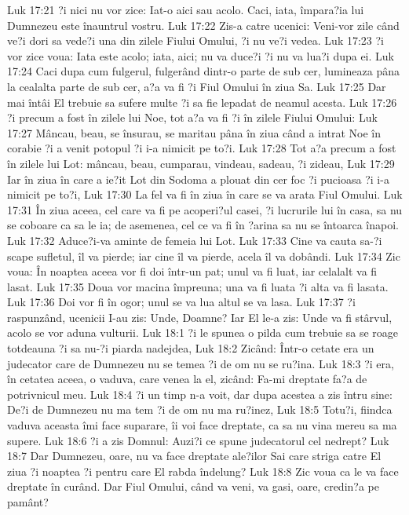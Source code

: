 Luk 17:21  ?i nici nu vor zice: Iat-o aici sau acolo. Caci, iata, împara?ia lui Dumnezeu este înauntrul vostru.
Luk 17:22  Zis-a catre ucenici: Veni-vor zile când ve?i dori sa vede?i una din zilele Fiului Omului, ?i nu ve?i vedea.
Luk 17:23  ?i vor zice voua: Iata este acolo; iata, aici; nu va duce?i ?i nu va lua?i dupa ei.
Luk 17:24  Caci dupa cum fulgerul, fulgerând dintr-o parte de sub cer, lumineaza pâna la cealalta parte de sub cer, a?a va fi ?i Fiul Omului în ziua Sa.
Luk 17:25  Dar mai întâi El trebuie sa sufere multe ?i sa fie lepadat de neamul acesta.
Luk 17:26  ?i precum a fost în zilele lui Noe, tot a?a va fi ?i în zilele Fiului Omului:
Luk 17:27  Mâncau, beau, se însurau, se maritau pâna în ziua când a intrat Noe în corabie ?i a venit potopul ?i i-a nimicit pe to?i.
Luk 17:28  Tot a?a precum a fost în zilele lui Lot: mâncau, beau, cumparau, vindeau, sadeau, ?i zideau,
Luk 17:29  Iar în ziua în care a ie?it Lot din Sodoma a plouat din cer foc ?i pucioasa ?i i-a nimicit pe to?i,
Luk 17:30  La fel va fi în ziua în care se va arata Fiul Omului.
Luk 17:31  În ziua aceea, cel care va fi pe acoperi?ul casei, ?i lucrurile lui în casa, sa nu se coboare ca sa le ia; de asemenea, cel ce va fi în ?arina sa nu se întoarca înapoi.
Luk 17:32  Aduce?i-va aminte de femeia lui Lot.
Luk 17:33  Cine va cauta sa-?i scape sufletul, îl va pierde; iar cine îl va pierde, acela îl va dobândi.
Luk 17:34  Zic voua: În noaptea aceea vor fi doi într-un pat; unul va fi luat, iar celalalt va fi lasat.
Luk 17:35  Doua vor macina împreuna; una va fi luata ?i alta va fi lasata.
Luk 17:36  Doi vor fi în ogor; unul se va lua altul se va lasa.
Luk 17:37  ?i raspunzând, ucenicii I-au zis: Unde, Doamne? Iar El le-a zis: Unde va fi stârvul, acolo se vor aduna vulturii.
Luk 18:1  ?i le spunea o pilda cum trebuie sa se roage totdeauna ?i sa nu-?i piarda nadejdea,
Luk 18:2  Zicând: Într-o cetate era un judecator care de Dumnezeu nu se temea ?i de om nu se ru?ina.
Luk 18:3  ?i era, în cetatea aceea, o vaduva, care venea la el, zicând: Fa-mi dreptate fa?a de potrivnicul meu.
Luk 18:4  ?i un timp n-a voit, dar dupa acestea a zis întru sine: De?i de Dumnezeu nu ma tem ?i de om nu ma ru?inez,
Luk 18:5  Totu?i, fiindca vaduva aceasta îmi face suparare, îi voi face dreptate, ca sa nu vina mereu sa ma supere.
Luk 18:6  ?i a zis Domnul: Auzi?i ce spune judecatorul cel nedrept?
Luk 18:7  Dar Dumnezeu, oare, nu va face dreptate ale?ilor Sai care striga catre El ziua ?i noaptea ?i pentru care El rabda îndelung?
Luk 18:8  Zic voua ca le va face dreptate în curând. Dar Fiul Omului, când va veni, va gasi, oare, credin?a pe pamânt?
